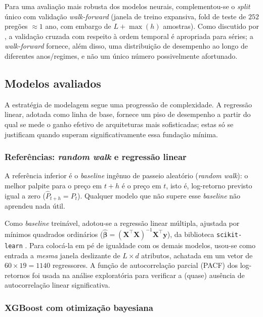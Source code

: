 \documentclass[12pt]{article}
\begin{document}
Para uma avaliação mais robusta dos modelos neurais, complementou-se o
\emph{split} único com validação \emph{walk-forward} (janela de treino
expansiva, fold de teste de $252$ pregões $\approx 1$ ano, com embargo de
$L + \max(h)$ amostras). Como discutido por \cite{bergmeir2012cv}, a validação
cruzada com respeito à ordem temporal é apropriada para séries; a
\emph{walk-forward} fornece, além disso, uma distribuição de desempenho ao
longo de diferentes anos/regimes, e não um único número possivelmente
afortunado.

\subsection{Modelos avaliados}
\label{sec:modelos}

A estratégia de modelagem segue uma progressão de complexidade. A regressão
linear, adotada como linha de base, fornece um piso de desempenho a partir do
qual se mede o ganho efetivo de arquiteturas mais sofisticadas; estas só se
justificam quando superam significativamente essa fundação mínima.

\subsubsection{Referências: \emph{random walk} e regressão linear}
\label{sec:baseline}

A referência inferior é o \emph{baseline} ingênuo de passeio aleatório
(\emph{random walk}): o melhor palpite para o preço em $t+h$ é o preço em $t$,
isto é, log-retorno previsto igual a zero ($\hat{P}_{t+h} = P_t$). Qualquer
modelo que não supere esse \emph{baseline} não aprendeu nada útil.

Como \emph{baseline} treinável, adotou-se a regressão linear múltipla,
ajustada por mínimos quadrados ordinários
($\hat{\boldsymbol{\beta}} = (\mathbf{X}^\top \mathbf{X})^{-1}\mathbf{X}^\top \mathbf{y}$),
da biblioteca \texttt{scikit-learn} \cite{pedregosa2011sklearn}. Para colocá-la
em pé de igualdade com os demais modelos, usou-se como entrada a \emph{mesma}
janela deslizante de $L \times d$ atributos, achatada em um vetor de
$60 \times 19 = 1140$ regressores. A função de autocorrelação parcial (PACF) dos
log-retornos foi usada na análise exploratória para verificar a (quase) ausência
de autocorrelação linear significativa.

\subsubsection{XGBoost com otimização bayesiana}
\label{sec:xgboost}
\end{document}
